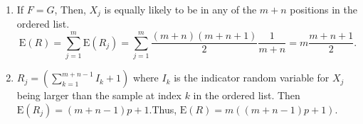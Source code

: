 \begin{enumerate}[label=(\alph*)]
\item If $F=G$, Then, $X_{j}$ is equally likely to be in any of the $m + n$
positions in the ordered list. 
$$\text{E}(R) = \sum_{j=1}^{m}\text{E}(R_{j}) = \sum_{j=1}^{m}\frac{(m+n)
(m+n+1)}{2}\frac{1}{m+n} = m\frac{m+n+1}{2}.$$

\item $R_{j} = (\sum_{k=1}^{m+n-1}I_{k} + 1)$ where $I_{k}$ is the indicator
random
variable for $X_{j}$ being larger than the sample at index $k$ in the ordered
list. Then $\text{E}(R_{j}) = (m+n-1)p + 1$.Thus, $\text{E}(R) = m((m+n-1)p +
1)$.
\end{enumerate}